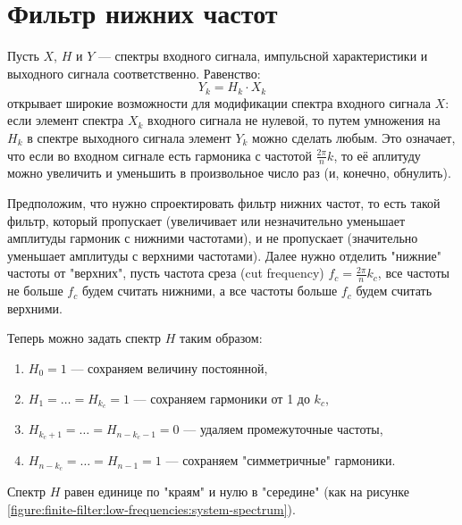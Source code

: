 \section{Фильтр нижних частот}

Пусть $X$, $H$ и $Y$ --- спектры входного сигнала, импульсной характеристики и выходного сигнала соответственно. Равенство:
\[
    Y_k = H_k \cdot X_k
\]
открывает широкие возможности для модификации спектра входного сигнала $X$: если элемент спектра $X_k$ входного сигнала не нулевой, то путем умножения на
$H_k$ в спектре выходного сигнала элемент $Y_k$ можно сделать любым. Это означает, что если во входном сигнале есть гармоника с частотой $\frac{2 \pi}{n} k$,
то её аплитуду можно увеличить и уменьшить в произвольное число раз (и, конечно, обнулить).

Предположим, что нужно спроектировать фильтр нижних частот, то есть такой фильтр, который пропускает (увеличивает или незначительно уменьшает амплитуды
гармоник с нижними частотами), и не пропускает (значительно уменьшает амплитуды с верхними частотами). Далее нужно отделить "нижние"{} частоты от
"верхних"{}, пусть частота среза (cut frequency) $f_c = \frac{2 \pi}{n} k_c$, все частоты не больше $f_c$ будем считать нижними, а все частоты больше $f_c$
будем считать верхними.

Теперь можно задать спектр $H$ таким образом:
\begin{enumerate}
    \item $H_0 = 1$ --- сохраняем величину постоянной,
    \item $H_1 = \dots = H_{k_c} = 1$ --- сохраняем гармоники от 1 до $k_c$,
    \item $H_{k_c + 1} = \dots = H_{n - k_c - 1} = 0$ --- удаляем промежуточные частоты,
    \item $H_{n - k_c} = \dots = H_{n-1} = 1$ --- сохраняем "симметричные"{} гармоники.
\end{enumerate}
Спектр $H$ равен единице по "краям"{} и нулю в "середине"{} (как на рисунке \ref{figure:finite-filter:low-frequencies:system-spectrum}).

